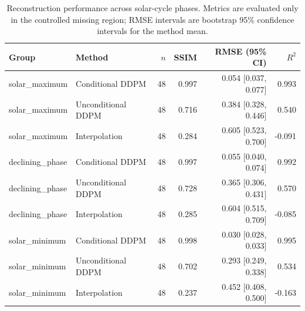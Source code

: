 \begin{table}[htbp]
\centering
\caption{Reconstruction performance across solar-cycle phases. Metrics are evaluated only in the controlled missing region; RMSE intervals are bootstrap 95\% confidence intervals for the method mean.}
\label{tab:solar_phase_robustness}
\begin{tabular}{llrrrr}
\hline
Group & Method & $n$ & SSIM & RMSE (95\% CI) & $R^2$ \\
\hline
solar_maximum & Conditional DDPM & 48 & 0.997 & 0.054 [0.037, 0.077] & 0.993 \\
solar_maximum & Unconditional DDPM & 48 & 0.716 & 0.384 [0.328, 0.446] & 0.540 \\
solar_maximum & Interpolation & 48 & 0.284 & 0.605 [0.523, 0.700] & -0.091 \\
\hline
declining_phase & Conditional DDPM & 48 & 0.997 & 0.055 [0.040, 0.074] & 0.992 \\
declining_phase & Unconditional DDPM & 48 & 0.728 & 0.365 [0.306, 0.431] & 0.570 \\
declining_phase & Interpolation & 48 & 0.285 & 0.604 [0.515, 0.709] & -0.085 \\
\hline
solar_minimum & Conditional DDPM & 48 & 0.998 & 0.030 [0.028, 0.033] & 0.995 \\
solar_minimum & Unconditional DDPM & 48 & 0.702 & 0.293 [0.249, 0.338] & 0.534 \\
solar_minimum & Interpolation & 48 & 0.237 & 0.452 [0.408, 0.500] & -0.163 \\
\hline
\end{tabular}
\end{table}

